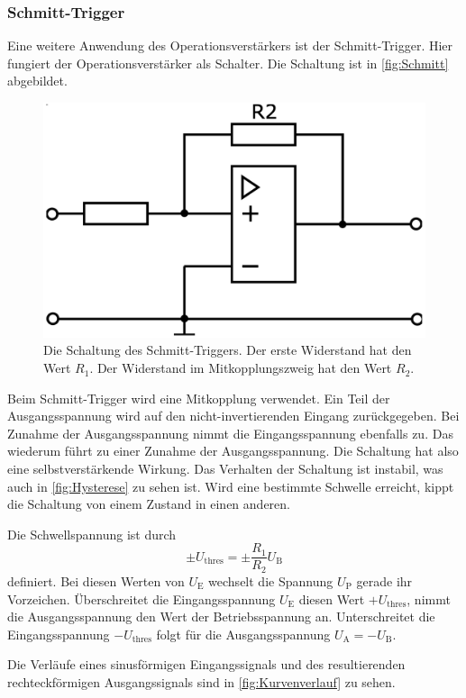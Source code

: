 \subsubsection{Schmitt-Trigger}
Eine weitere Anwendung des Operationsverstärkers ist der Schmitt-Trigger. Hier fungiert der Operationsverstärker als Schalter. Die Schaltung ist in \autoref{fig:Schmitt} abgebildet.

\begin{figure}
    \centering
    \includegraphics[width=0.7\linewidth]{./figures/4_Schmitt.png}
    \caption{Die Schaltung des Schmitt-Triggers. Der erste Widerstand hat den Wert $R_1$. Der Widerstand im Mitkopplungszweig hat den Wert $R_2$. \cite{V51}}
    \label{fig:Schmitt}
\end{figure}

Beim Schmitt-Trigger wird eine Mitkopplung verwendet. Ein Teil der Ausgangsspannung wird auf den nicht-invertierenden Eingang zurückgegeben. Bei Zunahme der Ausgangsspannung nimmt die Eingangsspannung ebenfalls zu. Das wiederum führt zu einer Zunahme der Ausgangsspannung. Die Schaltung hat also eine selbstverstärkende Wirkung.
Das Verhalten der Schaltung ist instabil, was auch in \autoref{fig:Hysterese} zu sehen ist. Wird eine bestimmte Schwelle erreicht, kippt die Schaltung von einem Zustand in einen anderen.

Die Schwellspannung ist durch 
\begin{equation*}
    \pm U_\text{thres} = \pm \frac{R_1}{R_2} U_\text{B}
    \label{eq:Schwelle}
\end{equation*}
definiert. Bei diesen Werten von $U_\text{E}$ wechselt die Spannung $U_\text{P}$ gerade ihr Vorzeichen.
Überschreitet die Eingangsspannung $U_\text{E}$ diesen Wert $+ U_\text{thres}$, nimmt die Ausgangsspannung den Wert der Betriebsspannung an. Unterschreitet die Eingangsspannung $- U_\text{thres}$ folgt für die Ausgangsspannung $U_\text{A} = - U_\text{B}$.

Die Verläufe eines sinusförmigen Eingangssignals und des resultierenden rechteckförmigen Ausgangssignals sind in \autoref{fig:Kurvenverlauf} zu sehen.

